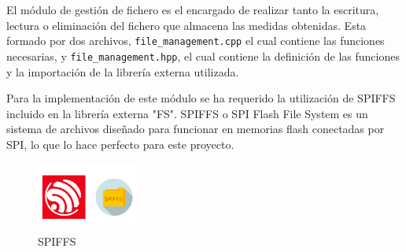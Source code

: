 El módulo de gestión de fichero es el encargado de realizar tanto la escritura, lectura o eliminación del fichero que almacena las medidas obtenidas. Esta formado por dos archivos, \texttt{file\_management.cpp} el cual contiene las funciones necesarias, y \texttt{file\_management.hpp}, el cual contiene la definición de las funciones y la importación de la librería externa utilizada.


Para la implementación de este módulo se ha requerido la utilización de SPIFFS incluido en la librería externa "FS". SPIFFS o SPI Flash File System es un sistema de archivos diseñado para funcionar en memorias flash conectadas por SPI, lo que lo hace perfecto para este proyecto.

\begin{figure}[H]
    \centering
    \includegraphics[width=0.3\textwidth]{images/3-software/3-2-1-filemng/esp8266-spiffs.png}
    \caption{SPIFFS}
    \label{fig:3-2-1-1-SPIFFS}
\end{figure}

